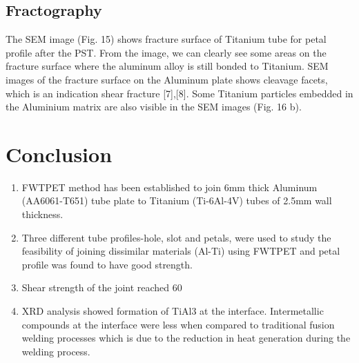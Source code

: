 \documentclass[3p]{elsarticle}
\begin{document}
\subsection{Fractography}
\label{subsec:Fractography}
The SEM image (Fig. 15) shows fracture surface of Titanium tube for petal profile after the PST. From the image, we can clearly see some areas on the fracture surface where the aluminum alloy is still bonded to Titanium. SEM images of the fracture surface on the Aluminum plate shows cleavage facets, which is an indication shear fracture [7],[8]. Some Titanium particles embedded in the Aluminium matrix are also visible in
the SEM images (Fig. 16 b).

\section{Conclusion}
\label{sec:Conclusion}
\begin{enumerate}[1.]
\item FWTPET method has been established to join 6mm thick Aluminum (AA6061-T651) tube plate to Titanium (Ti-6Al-4V) tubes of 2.5mm wall thickness.
\item Three different tube profiles-hole, slot and petals, were used to study the feasibility of joining dissimilar materials (Al-Ti) using FWTPET and petal profile was found to have good strength.
\item Shear strength of the joint reached 60%
\item XRD analysis showed formation of TiAl3 at the interface. Intermetallic compounds at the interface were less when compared to traditional fusion welding processes which is due to the reduction in heat generation during the welding process.
\end{enumerate}


%

%

\end{document}
